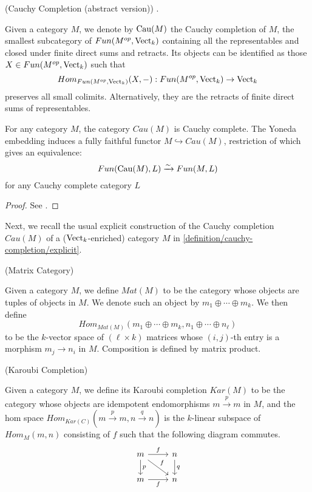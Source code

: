 \begin{definition} \label{definition/cauchy-completion/abstract} (Cauchy Completion (abstract version)) \cite[Sections 5.5 and 5.7]{kelly/basic-concepts-enriched}.

  \noindent Given a category $M$, we denote by $\operatorname{Cau}(M)$ the Cauchy completion
  of $M$, the smallest subcategory of $Fun(M^{op},\operatorname{Vect}_k)$ containing
  all the representables and closed under finite direct sums and retracts. Its
  objects can be identified as those $X \in Fun(M^{op},\operatorname{Vect}_k)$ such that
  $$Hom_{Fun(M^{op},\operatorname{Vect}_k)}(X,-): Fun(M^{op},\operatorname{Vect}_k) \to \operatorname{Vect}_k$$ preserves all
  small colimits. Alternatively, they are the retracts of finite direct sums
  of representables.
\end{definition}
 
\begin{lemma}\label{univ_prop_cau}

  \noindent For any category $M$, the category $Cau(M)$ is Cauchy complete.
  The Yoneda embedding induces a fully faithful functor $M \hookrightarrow
  Cau(M)$, restriction of which gives an equivalence: $$Fun(\operatorname{Cau}(M),L)
  \xrightarrow{\sim} Fun(M,L)$$ for any Cauchy complete category $L$
\end{lemma}

\begin{proof}
  See \cite[Sections 5.5 and 5.7]{kelly/basic-concepts-enriched}.
\end{proof}

\noindent Next, we recall the usual explicit construction of the Cauchy
completion $Cau(M)$ of a ($\operatorname{Vect}_k$-enriched) category $M$ in
\ref{definition/cauchy-completion/explicit}.

\begin{definition} (Matrix Category)

  \noindent Given a category $M$, we define $Mat(M)$ to be the category whose
  objects are tuples of objects in $M$. We denote such an object by
  $m_1\oplus\cdots\oplus m_k$. We then
  define $$Hom_{Mat(M)}(m_1\oplus\cdots\oplus m_k,n_1\oplus\cdots\oplus
  n_{\ell})$$ to be the $k$-vector space of $(\ell\times k)$ matrices whose
  $(i,j)$-th entry is a morphism $m_j\to n_i$ in $M$. Composition is defined
  by matrix product.
\end{definition}

\begin{definition} (Karoubi Completion)

  \noindent Given a category $M$, we define its Karoubi completion $Kar(M)$ to
  be the category whose objects are idempotent endomorphisms $m
  \xrightarrow{p} m$ in $M$, and the hom space $Hom_{Kar(C)}(m \xrightarrow{p}
  m, n \xrightarrow{q} n)$ is the $k$-linear subspace of $Hom_{M}(m,n)$
  consisting of $f$ such that the following diagram commutes.
  \[
    \begin{tikzcd}
    m & n \\
    m & n
    \arrow["f", from=1-1, to=1-2]
    \arrow["p", from=1-1, to=2-1]
    \arrow["f", from=1-1, to=2-2]
    \arrow["q", from=1-2, to=2-2]
    \arrow["f"', from=2-1, to=2-2]
    \end{tikzcd}
  \]
\end{definition}

